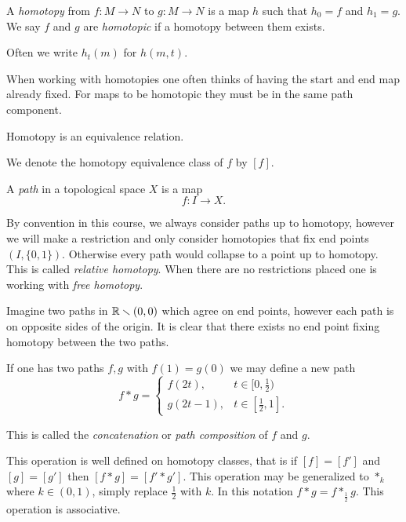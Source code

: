 \documentclass[11pt,leqno,oneside]{amsart}
\numberwithin{thm}{section}
\renewcommand{\setminus}{\smallsetminus}
\begin{document}
\begin{defn}
  A \emph{homotopy} from \(f \colon M \to N\) to \(g \colon M \to N\)
  is a map \(h\) such that \(h_0=f\) and \(h_1=g\). We say \(f\) and
  \(g\) are \emph{homotopic} if a homotopy between them exists.

  Often we write \(h_t(m)\) for \(h(m,t)\).
\end{defn}

When working with homotopies one often thinks of having the start and
end map already fixed. For maps to be homotopic they must be in the
same path component.

\begin{prop}
  Homotopy is an equivalence relation.
\end{prop}

We denote the homotopy equivalence class of \(f\) by \([f]\).

\begin{defn}
  A \emph{path} in a topological space $X$ is a map
  \[f \colon I \to X.\]
\end{defn}

By convention in this course, we always consider paths up to homotopy, however we will make a
restriction and only consider homotopies that fix end
points \((I,\{0,1\})\). Otherwise every path would collapse to a point up to
homotopy. This is called \emph{relative homotopy}. When there are no
restrictions placed one is working with \emph{free homotopy}.

Imagine two paths in \(\R \setminus (0,0)\) which agree on end points,
however each path is on opposite sides of the origin. It is clear that
there exists no end point fixing homotopy between the two paths.

\begin{defn}
  If one has two paths \(f,g\) with \(f(1)=g(0)\) we may define a new
  path
  \[f * g =
    \begin{cases}
      f(2t), & t \in [0,\frac{1}{2})\\
      g(2t - 1), & t \in [\frac{1}{2},1].
    \end{cases}
  \]

  This is called the \emph{concatenation} or \emph{path composition} of $f$ and $g$.

  This operation is well defined on homotopy classes, that is if
  \([f]=[f']\) and \([g]=[g']\) then \([f * g] = [f' * g']\). This
  operation may be generalized to \(*_{k}\) where \(k \in (0,1)\),
  simply replace \(\frac{1}{2}\) with \(k\). In this notation \(f * g =
  f *_{\frac{1}{2}} g\). This operation is associative.
\end{defn}
\end{document}
